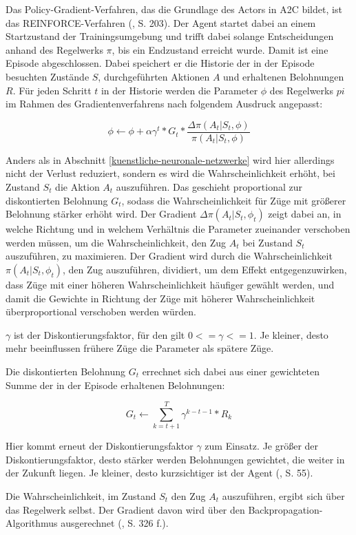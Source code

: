 Das Policy-Gradient-Verfahren, das die Grundlage des Actors in A2C bildet, ist das REINFORCE-Verfahren (\cite{Albrecht.2024}, S. 203). Der Agent startet dabei an einem Startzustand der Trainingsumgebung und trifft dabei solange Entscheidungen anhand des Regelwerks $\pi$, bis ein Endzustand erreicht wurde. Damit ist eine Episode abgeschlossen. Dabei speichert er die Historie der in der Episode besuchten Zustände $S$, durchgeführten Aktionen $A$ und erhaltenen Belohnungen $R$. Für jeden Schritt $t$ in der Historie werden die Parameter $\phi$ des Regelwerks $pi$ im Rahmen des Gradientenverfahrens nach folgendem Ausdruck angepasst:

\[ \phi \leftarrow \phi {+} \alpha \gamma ^{t} * G_t * \frac{\Delta \pi (A_t|S_t, \phi)}{\pi (A_t|S_t, \phi)} \]

Anders als in Abschnitt \ref{kuenstliche-neuronale-netzwerke} wird hier allerdings nicht der Verlust reduziert, sondern es wird die Wahrscheinlichkeit erhöht, bei Zustand $S_t$ die Aktion $A_t$ auszuführen. Das geschieht proportional zur diskontierten Belohnung $G_t$, sodass die Wahrscheinlichkeit für Züge mit größerer Belohnung stärker erhöht wird. Der Gradient $\Delta \pi (A_t|S_t, \phi_t)$ zeigt dabei an, in welche Richtung und in welchem Verhältnis die Parameter zueinander verschoben werden müssen, um die Wahrscheinlichkeit, den Zug $A_t$ bei Zustand $S_t$ auszuführen, zu maximieren. Der Gradient wird durch die Wahrscheinlichkeit $\pi (A_t|S_t, \phi_t)$, den Zug auszuführen, dividiert, um dem Effekt entgegenzuwirken, dass Züge mit einer höheren Wahrscheinlichkeit häufiger gewählt werden, und damit die Gewichte in Richtung der Züge mit höherer Wahrscheinlichkeit überproportional verschoben werden würden.

$\gamma$ ist der Diskontierungsfaktor, für den gilt $0 <= \gamma <= 1$. Je kleiner, desto mehr beeinflussen frühere Züge die Parameter als spätere Züge.

Die diskontierten Belohnung $G_t$ errechnet sich dabei aus einer gewichteten Summe der in der Episode erhaltenen Belohnungen:

\[ G_t \leftarrow \sum_{k=t+1}^{T} \gamma ^{k-t-1} * R_k \]

Hier kommt erneut der Diskontierungsfaktor $\gamma$ zum Einsatz. Je größer der Diskontierungsfaktor, desto stärker werden Belohnungen gewichtet, die weiter in der Zukunft liegen. Je kleiner, desto \glqq kurzsichtiger\grqq{} ist der Agent (\cite{Sutton.2018}, S. 55).

Die Wahrscheinlichkeit, im Zustand $S_t$ den Zug $A_t$ auszuführen, ergibt sich über das Regelwerk selbst. Der Gradient davon wird über den Backpropagation-Algorithmus ausgerechnet (\cite{Sutton.2018}, S. 326 f.).

